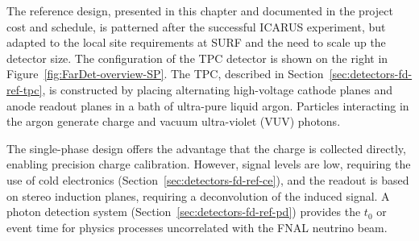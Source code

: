 The reference design, presented in this chapter and documented in the
project cost and schedule, is patterned after the successful ICARUS
experiment, but adapted to the local site requirements at SURF and the
need to scale up the detector size. The configuration of the TPC
detector is shown on the right in Figure~\ref{fig:FarDet-overview-SP}.
The TPC, described in Section~\ref{sec:detectors-fd-ref-tpc}, is
constructed by placing alternating high-voltage cathode planes and
anode readout planes in a bath of ultra-pure liquid argon. Particles
interacting in the argon generate charge and vacuum ultra-violet (VUV)
photons.


The single-phase design offers the advantage that the charge is
collected directly, enabling precision charge calibration. However,
signal levels are low, requiring the use of cold electronics
(Section~\ref{sec:detectors-fd-ref-ce}), and the readout is based on
stereo induction planes, requiring a deconvolution of the induced
signal. A photon detection system
(Section~\ref{sec:detectors-fd-ref-pd}) provides the $t_0$ or event
time for physics processes uncorrelated with the FNAL neutrino beam.
